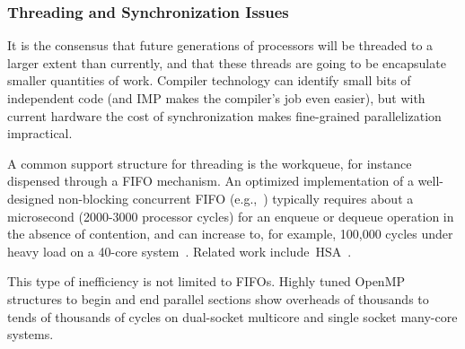\begin{comment}
Moving forward, however, underlying technology 
trends are forcing the use of ever-increasing numbers of independent threads (or tasks) as the 
primary driving factor in increased performance.   This is necessary both 
because of the plateau in single-processor performance and because of 
the desire to use compiler-generated parallelism where possible to improve
programmer productivity.  
\end{comment}

\subsubsection{Threading and Synchronization Issues}
\label{sec:issue-thread}

It is the consensus that future generations of processors will be
threaded to a larger extent than currently, and that these threads are
going to be encapsulate smaller quantities of work.  Compiler
technology can identify small bits of independent code (and IMP makes
the compiler's job even easier), but with current hardware the cost of 
synchronization makes fine-grained parallelization impractical.

A common support structure for threading is the workqueue, for instance
dispensed through a FIFO mechanism.
An optimized 
implementation of a well-designed non-blocking concurrent FIFO (e.g.,~\cite{michael1996simple})
typically requires
about a microsecond (2000-3000 processor cycles) for an enqueue or dequeue operation in the 
absence of contention, and can increase to, for example, 100,000 cycles under heavy load on a 40-core
system~\cite{kirsch2012performance}. Related work include~HSA~\cite{HSA:overview}.

This type of inefficiency is not limited to FIFOs.  Highly tuned OpenMP structures to begin and end
parallel sections show overheads of thousands to tends of thousands of cycles on dual-socket
multicore and single socket many-core systems.
\begin{comment}
 On a two-socket Xeon E5 system, the highly tuned 
OpenMP code generated by the Intel C compiler (version 13.0) requires an average of 9000 
cycles (3 microseconds) to launch 16 threads at the beginning of an OpenMP PARALLEL FOR 
loop, and an additional 3700 cycles to pull the threads together at the barrier at the end of the 
loop.  Thus each loop needs to be performing almost 13,000 cycles of work to reach 50\%
utilization.  The corresponding overheads on the 61 core Xeon Phi SE10P are 6-10 times
higher (in absolute measure, 2-4 times higher in cycles) for 61 to 244 threads.
\end{comment}

